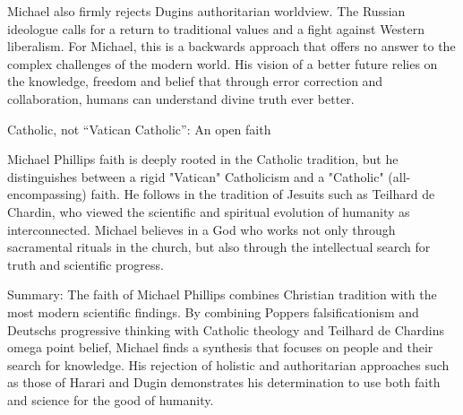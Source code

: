 \documentclass[
]{article}
\begin{document}
Michael also firmly rejects Dugin\textquotesingle s authoritarian
worldview. The Russian ideologue calls for a return to traditional
values \hspace{0pt}\hspace{0pt}and a fight against Western liberalism.
For Michael, this is a backwards approach that offers no answer to the
complex challenges of the modern world. His vision of a better future
relies on the knowledge, freedom and belief that through error
correction and collaboration, humans can understand divine truth ever
better.

Catholic, not ``Vatican Catholic'': An open faith

Michael Phillips\textquotesingle{} faith is deeply rooted in the
Catholic tradition, but he distinguishes between a rigid "Vatican"
Catholicism and a "Catholic" (all-encompassing) faith. He follows in the
tradition of Jesuits such as Teilhard de Chardin, who viewed the
scientific and spiritual evolution of humanity as interconnected.
Michael believes in a God who works not only through sacramental rituals
in the church, but also through the intellectual search for truth and
scientific progress.

Summary: The faith of Michael Phillips combines Christian tradition with
the most modern scientific findings. By combining
Popper\textquotesingle s falsificationism and Deutsch\textquotesingle s
progressive thinking with Catholic theology and Teilhard de
Chardin\textquotesingle s omega point belief, Michael finds a synthesis
that focuses on people and their search for knowledge. His rejection of
holistic and authoritarian approaches such as those of Harari and Dugin
demonstrates his determination to use both faith and science for the
good of humanity.
\end{document}
